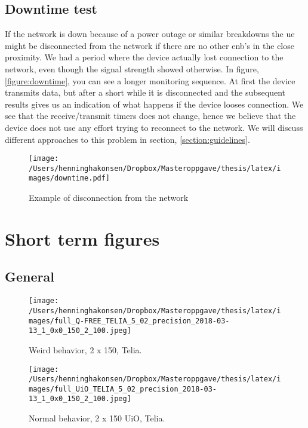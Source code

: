 \documentclass[USenglish]{ifimaster}  %
\begin{document}
\subsection{Downtime test} \label{ssection:downtimetest}
If the network is down because of a power outage or similar breakdowns the \acrshort{ue} might be disconnected from the network if there are no other \acrshort{enb}'s in the close proximity. We had a period where the device actually lost connection to the network, even though the signal strength showed otherwise. In figure, \vref{figure:downtime}, you can see a longer monitoring sequence. At first the device transmits data, but after a short while it is disconnected and the subsequent results gives us an indication of what happens if the device looses connection. We see that the receive/transmit timers does not change, hence we believe that the device does not use any effort trying to reconnect to the network. We will discuss different approaches to this problem in section, \vref{section:guidelines}.

\begin{figure}[H]
  \centering
  \texttt{[image: /Users/henninghakonsen/Dropbox/Masteroppgave/thesis/latex/images/downtime.pdf]}
  \caption{Example of disconnection from the network}
  \label{figure:downtime}
\end{figure}

\cleardoublepage
\section{Short term figures}
\subsection{General} \label{ssection:general}
\begin{figure}[H]
  \centering
  \texttt{[image: /Users/henninghakonsen/Dropbox/Masteroppgave/thesis/latex/images/full\_Q-FREE\_TELIA\_5\_02\_precision\_2018-03-13\_1\_0x0\_150\_2\_100.jpeg]}
  \caption{Weird behavior, 2 x 150, Telia.}
  \label{figure:2x150_QFREE_TELIA}
\end{figure}

\begin{figure}[H]
  \centering
  \texttt{[image: /Users/henninghakonsen/Dropbox/Masteroppgave/thesis/latex/images/full\_UiO\_TELIA\_5\_02\_precision\_2018-03-13\_1\_0x0\_150\_2\_100.jpeg]}
  \caption{Normal behavior, 2 x 150 UiO, Telia.}
  \label{figure:2x150_UIO_TELIA}
\end{figure}
\end{document}
